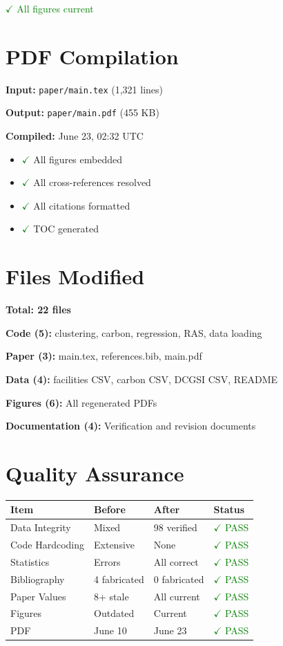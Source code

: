 \documentclass[11pt,a4paper]{article}
\begin{document}
\textcolor{green}{$\checkmark$ All figures current}

\section{PDF Compilation}

\textbf{Input:} \texttt{paper/main.tex} (1,321 lines)

\textbf{Output:} \texttt{paper/main.pdf} (455 KB)

\textbf{Compiled:} June 23, 02:32 UTC

\begin{itemize}
\item \textcolor{green}{$\checkmark$} All figures embedded
\item \textcolor{green}{$\checkmark$} All cross-references resolved
\item \textcolor{green}{$\checkmark$} All citations formatted
\item \textcolor{green}{$\checkmark$} TOC generated
\end{itemize}

\section{Files Modified}

\textbf{Total: 22 files}

\textbf{Code (5):} clustering, carbon, regression, RAS, data loading

\textbf{Paper (3):} main.tex, references.bib, main.pdf

\textbf{Data (4):} facilities CSV, carbon CSV, DCGSI CSV, README

\textbf{Figures (6):} All regenerated PDFs

\textbf{Documentation (4):} Verification and revision documents

\section{Quality Assurance}

\begin{center}
\begin{tabular}{llll}
\toprule
\textbf{Item} & \textbf{Before} & \textbf{After} & \textbf{Status} \\
\midrule
Data Integrity & Mixed & 98 verified & \textcolor{green}{$\checkmark$ PASS} \\
Code Hardcoding & Extensive & None & \textcolor{green}{$\checkmark$ PASS} \\
Statistics & Errors & All correct & \textcolor{green}{$\checkmark$ PASS} \\
Bibliography & 4 fabricated & 0 fabricated & \textcolor{green}{$\checkmark$ PASS} \\
Paper Values & 8+ stale & All current & \textcolor{green}{$\checkmark$ PASS} \\
Figures & Outdated & Current & \textcolor{green}{$\checkmark$ PASS} \\
PDF & June 10 & June 23 & \textcolor{green}{$\checkmark$ PASS} \\
\bottomrule
\end{tabular}
\end{center}
\end{document}
